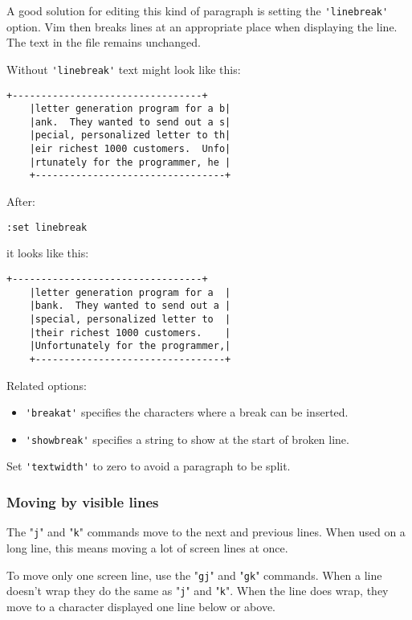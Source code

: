 A good solution for editing this kind of paragraph is setting the \verb!'linebreak'! option.
Vim then breaks lines at an appropriate place when displaying the line.
The text in the file remains unchanged.

Without \verb!'linebreak'! text might look like this:

\begin{Verbatim}[samepage=true]
    +---------------------------------+
    |letter generation program for a b|
    |ank.  They wanted to send out a s|
    |pecial, personalized letter to th|
    |eir richest 1000 customers.  Unfo|
    |rtunately for the programmer, he |
    +---------------------------------+
\end{Verbatim}

After:

\begin{Verbatim}[samepage=true]
 :set linebreak
\end{Verbatim}

it looks like this:

\begin{Verbatim}[samepage=true]
    +---------------------------------+
    |letter generation program for a  |
    |bank.  They wanted to send out a |
    |special, personalized letter to  |
    |their richest 1000 customers.    |
    |Unfortunately for the programmer,|
    +---------------------------------+
\end{Verbatim}

Related options:
\begin{itemize}
				\item \verb!'breakat'! specifies the characters where a break can be inserted.
				\item \verb!'showbreak'! specifies a string to show at the start of broken line.
\end{itemize}
Set \verb!'textwidth'! to zero to avoid a paragraph to be split.
\subsubsection{Moving by visible lines}
The "\verb!j!" and "\verb!k!" commands move to the next and previous lines.
When used on a long line, this means moving a lot of screen lines at once.

To move only one screen line, use the "\verb!gj!" and "\verb!gk!" commands.
When a line doesn't wrap they do the same as "\verb!j!" and "\verb!k!".
When the line does wrap, they move to a character displayed one line below or above.

